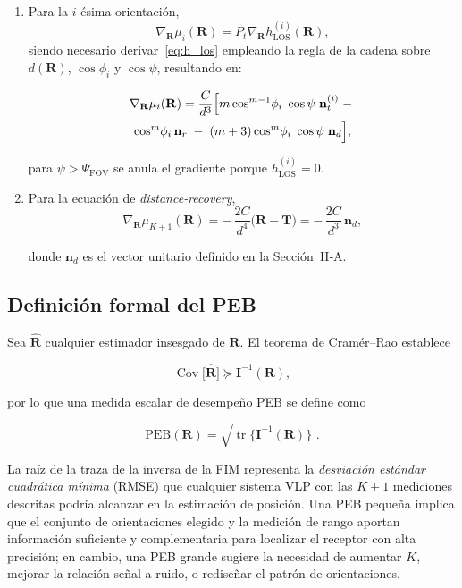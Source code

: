 \documentclass[lettersize,journal]{IEEEtran}
\begin{document}
\begin{enumerate}
\item
Para la $i$‑ésima orientación,
\[
\nabla_{\mathbf R}\mu_i(\mathbf R)
=
P_t\nabla_{\mathbf R}h_{\mathrm{LOS}}^{(i)}(\mathbf R),
\]
siendo necesario derivar~\eqref{eq:h_los} empleando la regla de la cadena sobre $d(\mathbf R)$, $\cos\phi_{i}$ y $\cos\psi$, resultando en:

\begin{multline}
\nabla_{\mathbf R}\mu_i(\mathbf R) =
\frac{C}{d^{3}}
\Bigl[
m\cos^{m-1}\!\phi_i\;\cos\psi\;\mathbf n_t^{(i)}
\;-\;\\
\cos^{m}\!\phi_i\,\mathbf n_r
\;-\;
(m+3)\cos^{m}\!\phi_i\;\cos\psi\;\mathbf n_d
\Bigr],
\label{eq:grad_mu_closed}
\end{multline}

para $\psi>\Psi_{\mathrm{FOV}}$ se anula el gradiente porque $h_{\text{LOS}}^{(i)}=0$.




\item
Para la ecuación de \emph{distance‑recovery},
\begin{equation}
    \nabla_{\mathbf R}\mu_{K+1}(\mathbf R)
=
-\,\frac{2C}{d^{4}} 
\bigl(\mathbf R-\mathbf T\bigr)
=
-\,\frac{2C}{d^{3}}\,
\mathbf n_d,
\end{equation}

donde $\mathbf n_d$ es el vector unitario definido en la Sección~II‑A.
\end{enumerate}

\subsection{Definición formal del PEB}

Sea $\hat{\mathbf R}$ cualquier estimador insesgado de $\mathbf R$.  El teorema de Cramér–Rao establece

\[
\operatorname{Cov}\!\bigl[\hat{\mathbf R}\bigr] 
\succeq 
\mathbf I^{-1}(\mathbf R),
\]

por lo que una medida escalar de desempeño PEB se define como

\begin{equation}
\text{PEB}(\mathbf R)
=\sqrt{\operatorname{tr}\bigl\{\mathbf I^{-1}(\mathbf R)\bigr\}}\;.
\label{eq:PEB}
\end{equation}

La raíz de la traza de la inversa de la FIM representa la \emph{desviación estándar cuadrática mínima} (RMSE) que cualquier sistema VLP con las $K+1$ mediciones descritas podría alcanzar en la estimación de posición.  Una PEB pequeña implica que el conjunto de orientaciones elegido y la medición de rango aportan información suficiente y complementaria para localizar el receptor con alta precisión; en cambio, una PEB grande sugiere la necesidad de aumentar $K$, mejorar la relación señal‑a‑ruido, o rediseñar el patrón de orientaciones.
\end{document}
